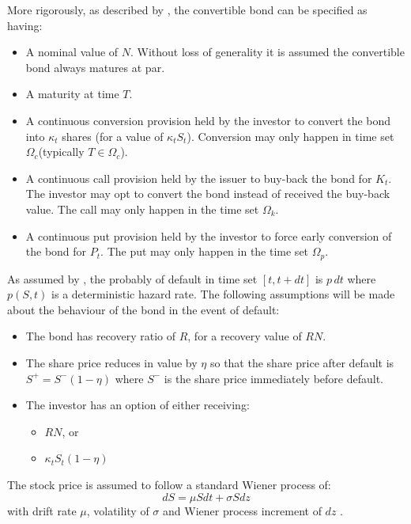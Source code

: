 \documentclass[a4paper,11pt,oneside]{article}
\def\convK{\ensuremath{\kappa_t}\xspace}
\def\convKS{\ensuremath{\convK S_t}\xspace}
\def\convT{\ensuremath{\Omega_c}\xspace}
\def\putK{\ensuremath{P_t}\xspace}
\def\putT{\ensuremath{\Omega_p}\xspace}
\def\callK{\ensuremath{K_t}\xspace}
\def\callT{\ensuremath{\Omega_k}\xspace}
\def\defN{\ensuremath{R}\xspace}
\def\defS{\ensuremath{\eta}\xspace}
\begin{document}
More rigorously, as described by \citet{AKW08}, the convertible bond can be specified as having:
\begin{itemize}[noitemsep,nolistsep]
 \item A nominal value of $N$.  Without loss of generality it is assumed the convertible bond always matures at par.
 \item A maturity at time $T$.
 \item A continuous conversion provision held by the investor to convert the bond into \convK shares (for a value of \convKS).  Conversion may only happen in time set \convT (typically $T \in \convT$).
 \item A continuous call provision held by the issuer to buy-back the bond for \callK.  The investor may opt to convert the bond instead of received the buy-back value.  The call may only happen in the time set \callT.
 \item A continuous put provision held by the investor to force early conversion of the bond for \putK.  The put may only happen in the time set \putT.
\end{itemize}

As assumed by \citet{AFV03}, the probably of default in time set $[t, t + dt]$ is $p\,dt$ where $p(S, t)$ is a deterministic hazard rate.  The following assumptions will be made about the behaviour of the bond in the event of default:
\begin{itemize}[noitemsep,nolistsep]
 \item The bond has recovery ratio of \defN, for a recovery value of $\defN N$.
 \item The share price reduces in value by \defS so that the share price after default is $S^+ = S^- (1 - \defS)$ where $S^-$ is the share price immediately before default.
 \item The investor has an option of either receiving:
 \begin{itemize}[noitemsep,nolistsep]
  \item $\defN N$, or
  \item $\convK S_t (1 - \defS)$
 \end{itemize}
\end{itemize}

The stock price is assumed to follow a standard Wiener process of:
\begin{displaymath}
dS = \mu S dt + \sigma S dz
\end{displaymath}
with drift rate $\mu$, volatility of $\sigma$ and Wiener process increment of $dz$ \cite{AFV03}.
\end{document}
